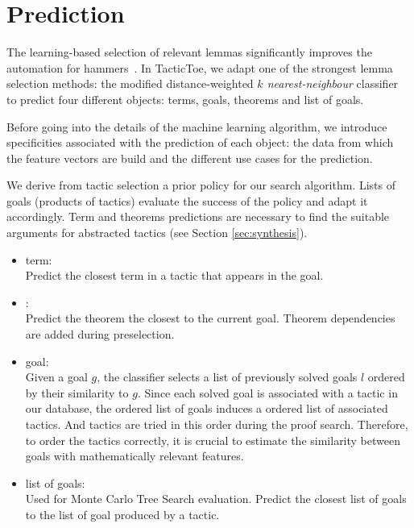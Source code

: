 \documentclass[runningheads,a4paper,draft]{svjour3}
\def\tactictoe{\textsf{TacticToe}\xspace}
\begin{document}
\section{Prediction}\label{s:prediction}

The learning-based selection of relevant lemmas significantly improves the 
automation for hammers~\cite{BlanchetteGKKU16}. In \tactictoe, we adapt 
one of the strongest lemma selection 
methods: the modified distance-weighted \emph{$k$ nearest-neighbour} 
classifier~\cite{ckju-pxtp13,DudaniS76} to predict four different objects: 
terms, goals, theorems and list of goals. 

Before going into the details of the machine learning algorithm, we introduce
specificities associated with the prediction of each object: the data from 
which the feature vectors are build and the different use cases for the 
prediction. 
 
We derive from tactic selection a prior policy for 
our search algorithm. Lists of goals (products of tactics) evaluate the success 
of the policy and adapt it accordingly. Term and theorems predictions are 
necessary to find the suitable arguments for abstracted tactics (see Section 
\ref{sec:synthesis}).




\begin{itemize}
\item term:\\
Predict the closest term in a tactic that appears in the goal.

\item :\\
Predict the theorem the closest to the current goal. Theorem dependencies are 
added during preselection.

\item goal:\\
Given a goal $g$, the classifier selects a list of previously solved goals $l$
ordered by their similarity to $g$. Since each solved goal is associated 
with a tactic in our database, the ordered list of goals induces a ordered  
list of associated tactics. And tactics are tried in this order during the 
proof search. Therefore, to order the tactics correctly, it is crucial to 
estimate the similarity between goals with mathematically relevant features.

\item list of goals:\\
Used for Monte Carlo Tree Search evaluation. Predict the closest list of goals
to the list of goal produced by a tactic.
\end{itemize}
\end{document}
